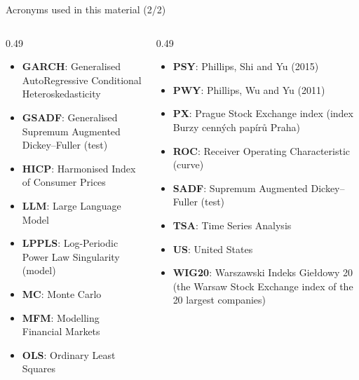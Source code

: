 \begin{frame}{Acronyms used in this material (2/2)}
\begin{columns}[T]
\begin{column}{0.49\textwidth}
\begin{itemize}\setlength{\itemsep}{0pt}
    \item \textbf{GARCH}: Generalised AutoRegressive Conditional Heteroskedasticity
    \item \textbf{GSADF}: Generalised Supremum Augmented Dickey–Fuller (test)
    \item \textbf{HICP}: Harmonised Index of Consumer Prices
    \item \textbf{LLM}: Large Language Model
    \item \textbf{LPPLS}: Log-Periodic Power Law Singularity (model)
    \item \textbf{MC}: Monte Carlo
    \item \textbf{MFM}: Modelling Financial Markets
    \item \textbf{OLS}: Ordinary Least Squares
\end{itemize}
\end{column}
\begin{column}{0.49\textwidth}
\begin{itemize}\setlength{\itemsep}{0pt}
    \item \textbf{PSY}: Phillips, Shi and Yu (2015)
    \item \textbf{PWY}: Phillips, Wu and Yu (2011)
    \item \textbf{PX}: Prague Stock Exchange index (index Burzy cenných papírů Praha)
    \item \textbf{ROC}: Receiver Operating Characteristic (curve)
    \item \textbf{SADF}: Supremum Augmented Dickey–Fuller (test)
    \item \textbf{TSA}: Time Series Analysis
    \item \textbf{US}: United States
    \item \textbf{WIG20}: Warszawski Indeks Giełdowy 20 (the Warsaw Stock Exchange index of the 20 largest companies)
\end{itemize}
\end{column}
\end{columns}
\end{frame}

